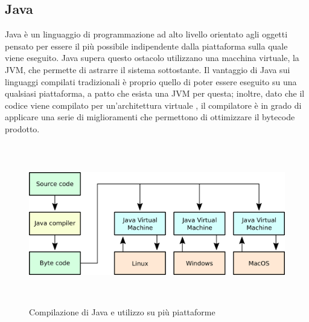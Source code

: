    \subsection{Java}
   Java è un linguaggio di programmazione ad alto livello orientato agli oggetti pensato per essere il più possibile indipendente dalla piattaforma sulla quale viene eseguito. Java supera questo ostacolo utilizzano una macchina virtuale, la \gls{JVM}, che permette di astrarre il sistema sottostante. Il vantaggio di Java sui linguaggi compilati tradizionali è proprio quello di poter essere eseguito su una qualsiasi piattaforma, a patto che esista una \gls{JVM} per questa; inoltre, dato che il codice viene compilato per un'architettura virtuale , il compilatore è in grado di applicare una serie di miglioramenti che permettono di ottimizzare il bytecode prodotto.
   \begin{figure}[H]
      \begin{center}
         \includegraphics[width=16.5cm,height=7cm,keepaspectratio]{immagini/processo-compilazione-java}
      \end{center}
      \caption{Compilazione di Java e utilizzo su più piattaforme}
   \end{figure}
